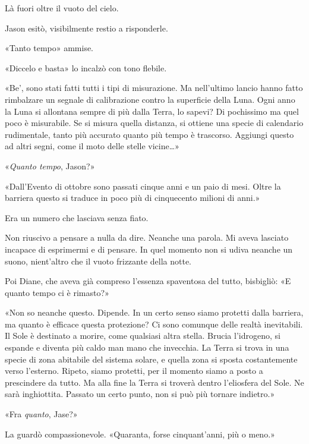 Là fuori oltre il vuoto del cielo.

Jason esitò, visibilmente restio a risponderle.

«Tanto tempo» ammise.

«Diccelo e basta» lo incalzò con tono flebile.

«Be', sono stati fatti tutti i tipi di misurazione. Ma nell'ultimo
lancio hanno fatto rimbalzare un segnale di calibrazione contro la
superficie della Luna. Ogni anno la Luna si allontana sempre di più
dalla Terra, lo sapevi? Di pochissimo ma quel poco è misurabile. Se si
misura quella distanza, si ottiene una specie di calendario rudimentale,
tanto più accurato quanto più tempo è trascorso. Aggiungi questo ad
altri segni, come il moto delle stelle vicine\ldots»

«\emph{Quanto tempo}, Jason?»

«Dall'Evento di ottobre sono passati cinque anni e un paio di mesi.
Oltre la barriera questo si traduce in poco più di cinquecento milioni
di anni.»

Era un numero che lasciava senza fiato.

Non riuscivo a pensare a nulla da dire. Neanche una parola. Mi aveva
lasciato incapace di esprimermi e di pensare. In quel momento non si
udiva neanche un suono, nient'altro che il vuoto frizzante della notte.

Poi Diane, che aveva già compreso l'essenza spaventosa del tutto,
bisbigliò: «E quanto tempo ci è rimasto?»

«Non so neanche questo. Dipende. In un certo senso siamo protetti dalla
barriera, ma quanto è efficace questa protezione? Ci sono comunque delle
realtà inevitabili. Il Sole è destinato a morire, come qualsiasi altra
stella. Brucia l'idrogeno, si espande e diventa più caldo man mano che
invecchia. La Terra si trova in una specie di zona abitabile del sistema
solare, e quella zona si sposta costantemente verso l'esterno. Ripeto,
siamo protetti, per il momento siamo a posto a prescindere da tutto. Ma
alla fine la Terra si troverà dentro l'eliosfera del Sole. Ne sarà
inghiottita. Passato un certo punto, non si può più tornare indietro.»

«Fra \emph{quanto}, Jase?»

La guardò compassionevole. «Quaranta, forse cinquant'anni, più o meno.»